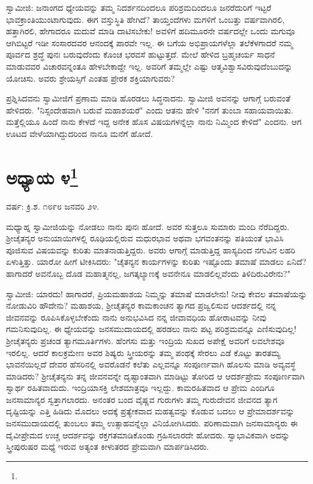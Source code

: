 ಸ್ವಾಮೀಜಿ: ಜನಾಂಗದ ಧ್ಯೇಯವನ್ನು ತಮ್ಮ ನಿದರ್ಶನದಿಂದಲೂ ಪರಿಶ್ರಮದಿಂದಲೂ ಜನರೆದುರಿಗೆ ಇಟ್ಟರೆ ಭಾವಕ್ರಾಂತಿಯುಂಟಾಗುವುದು. ಈಗ ವಸ್ತುಸ್ಥಿತಿ ಹೇಗಿದೆ? ತಾಯ್ತಂದೆಗಳು ಮಗಳಿಗೆ ಒಂಬತ್ತು ವರ್ಷವಾಗಿರಲಿ, ಹತ್ತಾಗಿರಲಿ, ಹೇಗಾದರೂ ಮದುವೆ ಮಾಡಿ ದಾಟಿಸಬೇಕು! ಅವಳಿಗೆ ಹದಿಮೂರನೇ ವರ್ಷದಲ್ಲೇ ಒಂದು ಮಗುವೂ ಆಗಿಬಿಟ್ಟರೆ ಇಡೀ ಸಂಸಾರದವರ ಆನಂದಕ್ಕೆ ಪಾರವೇ ಇಲ್ಲ. ಈ ಬಗೆಯ ಅಭಿಪ್ರಾಯಗಳೆಲ್ಲಾ ತಲೆಕೆಳಗಾದರೆ ನಮ್ಮ ಪೂರ್ವದ ಶ್ರದ್ಧೆ ಪುನಃ ಬರುವುದೆಂದು ಕೊಂಚ ಭರವಸೆ ಹುಟ್ಟುತ್ತದೆ. ಮೇಲೆ ಹೇಳಿದ ಬ್ರಹ್ಮಚರ್ಯ ಸಾಧನೆ ಮಾಡುವವರ ವಿಚಾರವನ್ನಂತೂ ಹೇಳಬೇಕಾದ್ದೇ ಇಲ್ಲ. ಅವರಿಗೆ ತಮ್ಮಲ್ಲೇ ಎಷ್ಟು ಆತ್ಮವಿಶ್ವಾಸವಿರುವುದೆಂಬುದನ್ನು ಯೋಚಿಸು. ಅವರು ಶ್ರೇಯಸ್ಸಿಗೆ ಎಂತಹ ಪ್ರೇರಕ ಶಕ್ತಿಯಾಗುವರು?

ಪ್ರಶ್ನಿಸಿದವನು ಸ್ವಾಮೀಜಿಗೆ ಪ್ರಣಾಮ ಮಾಡಿ ಹೊರಡಲು ಸಿದ್ಧನಾದನು. ಸ್ವಾಮೀಜಿ ಅವನನ್ನು ಆಗಾಗ್ಗೆ ಬರುವಂತೆ ಹೇಳಿದರು. "ನಿಸ್ಸಂದೇಹವಾಗಿ ಬರುವೆ ಮಹಾಶಯರೆ" ಎಂದು ಆತನು ಹೇಳಿ "ನನಗೆ ತುಂಬಾ ಸಹಾಯವಾಯಿತು. ಮತ್ತೆಲ್ಲಿಯೂ ಹಿಂದೆ ನಾನು ಕೇಳದೆ ಇದ್ದ ಅನೇಕ ಹೊಸ ವಿಷಯಗಳನ್ನೆಲ್ಲಾ ನಾನು ನಿಮ್ಮಿಂದ ಕೇಳಿದೆ" ಎಂದನು. ಆಗ ಊಟದ ವೇಳೆಯಾಗಿದ್ದುದರಿಂದ ನಾನೂ ಮನೆಗೆ ಹೋದೆ.

\newpage

\chapter[ಅಧ್ಯಾಯ ೪]{ಅಧ್ಯಾಯ ೪\protect\footnote{}}

\begin{center}
ವರ್ಷ: ಕ್ರಿ.ಶ. ೧೮೯೮ ಜನವರಿ ೨೪.
\end{center}

ಮಧ್ಯಾಹ್ನ ಸ್ವಾಮೀಜಿಯನ್ನು ನೋಡಲು ನಾನು ಪುನಃ ಹೋದೆ. ಅವರ ಸುತ್ತಲೂ ಸುಮಾರು ಮಂದಿ ನೆರೆದಿದ್ದರು. ಶ‍್ರೀಚೈತನ್ಯರ ಅನುಯಾಯಿಗಳಲ್ಲಿ ರೂಢಿಯಲ್ಲಿರುವ ಮಧುರಭಾವ ಅಥವಾ ಭಗವಂತನನ್ನು ಪತಿಯಂತೆ ಭಾವಿಸಿ ಪೂಜಿಸುವ ವಿಷಯವನ್ನು ಕುರಿತು ಮಾತನಾಡುತ್ತಿದ್ದರು. ಅವರು ಆಗಾಗ್ಗೆ ಮಾಡುತ್ತಿದ್ದ ಹಾಸ್ಯದಿಂದ ನಗುವಿನ ಲಹರಿ ಏಳುತ್ತಿತ್ತು. ಯಾರೋ ಹೀಗೆ ಟೀಕಿಸಿದರು: "ಚೈತನ್ಯನ ಕಾರ್ಯಗಳನ್ನು ಕುರಿತು ಇಷ್ಟೊಂದು ತಮಾಷೆ ಮಾಡಲು ಏನಿದೆ? ಹಾಗಾದರೆ ಅವನೊಬ್ಬ ದೊಡ ಮಹಾತ್ಮನಲ್ಲ, ಜಗತ್ಕಲ್ಯಾಣಕ್ಕೆ ಅವನೇನೂ ಮಾಡಲಿಲ್ಲವೆಂದು ತಿಳಿದಿರುವಿರೇನು?"

ಸ್ವಾಮೀಜಿ: ಯಾರದು! ಹಾಗಾದರೆ, ಪ್ರಿಯಮಹಾಶಯ ನಿಮ್ಮನ್ನು ತಮಾಷೆ ಮಾಡಲೇನು! ನೀವು ಕೇವಲ ತಮಾಷೆಯನ್ನು ನೋಡುವಿರಿ ಹೌದೇನು? ಮಹಾಶಯ, ಶ‍್ರೀಚೈತನ್ಯರ ಕಾಮಕಾಂಚನ ತ್ಯಾಗದ ಪ್ರಜ್ವಲಿಸುವ ಆದರ್ಶದಲ್ಲಿ ನನ್ನ ಜೀವನವನ್ನು ರೂಪಿಸಿಕೊಳ್ಳಬೇಕೆಂದು ನಾನು ಅನುಭವಿಸಿದ ನನ್ನ ಜೀವಾವಧಿಯ ಹೋರಾಟವನ್ನು ನೀವು ಗಮನಿಸುವುದಿಲ್ಲ. ಈ ಧ್ಯೇಯವನ್ನು ಜನಸಮುದಾಯದಲ್ಲಿ ಹರಡಲು ನಾನು ಪಟ್ಟ ಪರಿಶ್ರಮವನ್ನೂ ಎಣಿಸುವುದಿಲ್ಲ! ಶ‍್ರೀಚೈತನ್ಯರು ಪ್ರಚಂಡ ತ್ಯಾಗಮೂರ್ತಿಗಳು. ಹೆಂಗಸು ಮತ್ತು ಇಂದ್ರಿಯ ಸುಖದ ಅಪೇಕ್ಷೆ ಅವರಿಗೆ ಲವಲೇಶವೂ ಇರಲಿಲ್ಲ. ಆದರೆ ಕಾಲಕ್ರಮೇಣ ಅವರ ಶಿಷ್ಯರು ಸ್ತ್ರೀಯರನ್ನು ತಮ್ಮ ಪಂಥಕ್ಕೆ ಸೇರಲು ಎಡೆ ಕೊಟ್ಟು ತಾರತಮ್ಯ ಭಾವನೆಯಿಲ್ಲದೆ ದೇವರ ಹೆಸರಿನಲ್ಲಿ ಅವರೊಡನೆ ಕಲೆತು ಎಲ್ಲವನ್ನೂ ಸಂಪೂರ್ಣವಾಗಿ ಹೊಲಸು ಮಾಡಿ ಅವ್ಯವಸ್ಥೆ ಮಾಡಿದರು? ಶ‍್ರೀಚೈತನ್ಯನು ತನ್ನ ಜೀವನವನ್ನೇ ದೃಷ್ಟಾಂತವಾಗಿ ಮಾಡಿಟ್ಟು ತೋರಿದ ಆ ಆದರ್ಶಪ್ರೇಮ ಸಂಪೂರ್ಣವಾಗಿ ಸ್ವಾರ್ಥ ರಹಿತವಾದುದು. ಇಂದ್ರಿಯಾಸಕ್ತಿ ಲೇಶಮಾತ್ರವೂ ಇಲ್ಲದ್ದು. ಕಾಮರಹಿತವಾದ ಆ ಪ್ರೇಮ ಎಂದಿಗೂ ಜನಸಾಮಾನ್ಯರ ಸ್ವತ್ತಾಗಲಾರದು. ಅನಂತರ ಬಂದ ವೈಷ್ಣವ ಗುರುಗಳು ತಮ್ಮ ಗುರುದೇವನ ಜೀವನದ ತ್ಯಾಗ ದೃಷ್ಟಿಯನ್ನು ಎತ್ತಿ ಹಿಡಿದು ಮೊದಲು ಅದಕ್ಕೆ ಪ್ರತ್ಯೇಕವಾದ ಮಹತ್ವವನ್ನು ಕೊಡುವ ಬದಲು ಆ ಪ್ರೇಮಾದರ್ಶವನ್ನು ಜನಸಮುದಾಯದಲ್ಲಿ ತುಂಬಲು ತಮ್ಮ ಉತ್ಸಾಹವನ್ನೆಲ್ಲಾ ವಿನಿಯೋಗಿಸಿದರು. ಪರಿಣಾಮವಾಗಿ ಜನಸಾಮಾನ್ಯರು ಈ ದೈವೀಪ್ರೇಮದ ಉಚ್ಚ ಆದರ್ಶವನ್ನು ರಕ್ತಗತಮಾಡಿಕೊಂಡು ಗ್ರಹಿಸಲಾರದೇ ಹೋದರು. ಸ್ವಾಭಾವಿಕವಾಗಿ ಅದನ್ನು ಸ್ತ್ರೀಪುರುಷರ ಮಧ್ಯೆ ಇರುವ ಅತ್ಯಂತ ಕೀಳುತರದ ಪ್ರೇಮವಾಗಿ ಮಾರ್ಪಡಿಸಿದರು.

